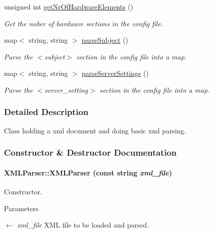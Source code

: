 \begin{DoxyCompactItemize}
unsigned int \hyperlink{class_x_m_l_parser_ae07c6d8e846b82d5a3e0dbbe97cba58b}{getNrOfHardwareElements} ()
\begin{DoxyCompactList}\small\item\em Get the nuber of hardware sections in the config file. \item\end{DoxyCompactList}\item 
map$<$ string, string $>$ \hyperlink{class_x_m_l_parser_a39c0441d925941cdbda86f14b01c659b}{parseSubject} ()
\begin{DoxyCompactList}\small\item\em Parse the $<$subject$>$ section in the config file into a map. \item\end{DoxyCompactList}\item 
map$<$ string, string $>$ \hyperlink{class_x_m_l_parser_acfd864a8c8cdbef4dcfa3516de24e752}{parseServerSettings} ()
\begin{DoxyCompactList}\small\item\em Parse the $<$server\_\-setting$>$ section in the config file into a map. \item\end{DoxyCompactList}\end{DoxyCompactItemize}


\subsubsection{Detailed Description}
Class holding a xml document and doing basic xml parsing. 

\subsubsection{Constructor \& Destructor Documentation}
\hypertarget{class_x_m_l_parser_a43f8cd70bcde521bb6a34e7276492b43}{
\paragraph[{XMLParser}]{\setlength{\rightskip}{0pt plus 5cm}XMLParser::XMLParser (const string {\em xml\_\-file})}\hfill}
\label{class_x_m_l_parser_a43f8cd70bcde521bb6a34e7276492b43}


Constructor. 
\begin{DoxyParams}{Parameters}
\item[\mbox{$\leftarrow$} {\em xml\_\-file}]XML file to be loaded and parsed. \end{DoxyParams}

